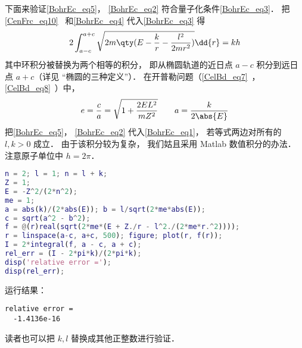 下面来验证\autoref{BohrEc_eq5}， \autoref{BohrEc_eq2} 符合量子化条件\autoref{BohrEc_eq3}． 把\autoref{CenFrc_eq10}~ 和\autoref{BohrEc_eq4}  代入\autoref{BohrEc_eq3} 得
\begin{equation}\label{BohrEc_eq1}
2\int_{a-c}^{a+c} \sqrt{2m\qty(E - \frac{k}{r} - \frac{l^2}{2mr^2})} \dd{r} = kh
\end{equation}
其中环积分被替换为两个相等的积分， 即从椭圆轨道的近日点 $a-c$ 积分到远日点 $a+c$（详见 “椭圆的三种定义”）． 在开普勒问题（\autoref{CelBd_eq7}~，\autoref{CelBd_eq8}~）中，
\begin{equation}
e = \frac{c}{a} = \sqrt{1 + \frac{2EL^2}{mZ^2}}
\qquad
a = \frac{k}{2\abs{E}}
\end{equation}
把\autoref{BohrEc_eq5}， \autoref{BohrEc_eq2} 代入\autoref{BohrEc_eq1}， 若等式两边对所有的 $l,k > 0$ 成立． 由于该积分较为复杂， 我们姑且采用 Matlab 数值积分的办法． 注意原子单位中 $h = 2\pi$．
\begin{lstlisting}[language=matlab]
n = 2; l = 1; n = l + k;
Z = 1;
E = -Z^2/(2*n^2);
me = 1;
a = abs(k)/(2*abs(E)); b = l/sqrt(2*me*abs(E));
c = sqrt(a^2 - b^2);
f = @(r)real(sqrt(2*me*(E + Z./r - l^2./(2*me*r.^2))));
r = linspace(a-c, a+c, 500); figure; plot(r, f(r));
I = 2*integral(f, a - c, a + c);
rel_err = (I - 2*pi*k)/(2*pi*k);
disp('relative error =');
disp(rel_err);
\end{lstlisting}
运行结果： 
\begin{lstlisting}[language=matlabC]
relative error =
  -1.4136e-16
\end{lstlisting}
读者也可以把 $k, l$ 替换成其他正整数进行验证．
